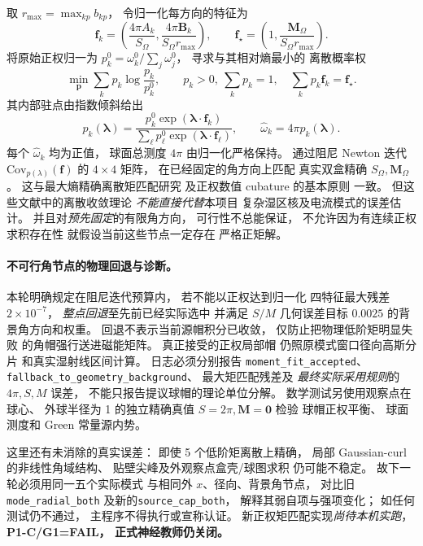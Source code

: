 取 $r_{\max}=\max_{kp}b_{kp}$，
令归一化每方向的特征为
\[
 \bm f_k=\left(
 \frac{4\pi A_k}{S_\Omega},
 \frac{4\pi\bm B_k}{S_\Omega r_{\max}}
 \right),\qquad
 \bm f_\star=
 \left(1,\frac{\bm M_\Omega}{S_\Omega r_{\max}}\right).
\]
将原始正权归一为
$p_k^0=\omega_k^0/\sum_j\omega_j^0$，
寻求与其相对熵最小的
离散概率权
\[
 \min_{\bm p}\sum_k
 p_k\log\frac{p_k}{p_k^0},
 \qquad
 p_k>0,\ \sum_kp_k=1,\quad
 \sum_kp_k\bm f_k=\bm f_\star.
\]
其内部驻点由指数倾斜给出
\begin{equation}
 p_k(\bm\lambda)=
 \frac{p_k^0\exp(\bm\lambda\cdot\bm f_k)}
      {\sum_\ell p_\ell^0
       \exp(\bm\lambda\cdot\bm f_\ell)},
 \qquad
 \widehat\omega_k=4\pi p_k(\bm\lambda).
 \label{eq:p1-c-positive-moment-tilt}
\end{equation}
每个 $\widehat\omega_k$ 均为正值，
球面总测度 $4\pi$ 由归一化严格保持。
通过阻尼 Newton 迭代
$\mathrm{Cov}_{p(\lambda)}(\bm f)$
的 $4\times4$ 矩阵，
在已经固定的角方向上匹配
真实双盒精确 $S_\Omega,\bm M_\Omega$。
这与最大熵精确离散矩匹配研究
\cite{tanaka2015exactmoments}
及正权数值 cubature 的基本原则
\cite{glaubitz2023positive} 一致。
但这些文献中的离散收敛理论
\emph{不能直接代替}本项目
复杂湿区核及电流模式的误差估计。
并且对\emph{预先固定}的有限角方向，
可行性不总能保证，
不允许因为有连续正权求积存在性
就假设当前这些节点一定存在
严格正矩解。

\paragraph{不可行角节点的物理回退与诊断。}
本轮明确规定在阻尼迭代预算内，
若不能以正权达到归一化
四特征最大残差 $2\times10^{-7}$，
\emph{整点回退}至先前已经实际选中
并满足 $S/M$ 几何误差目标
$0.0025$ 的背景角方向和权重。
回退不表示当前源帽积分已收敛，
仅防止把物理低阶矩明显失败
的角帽强行送进磁能矩阵。
真正接受的正权局部帽
仍照原模式窗口径向高斯分片
和真实湿射线区间计算。
日志必须分别报告
\texttt{moment\_fit\_accepted}、
\texttt{fallback\_to\_geometry\_background}、
最大矩匹配残差及
\emph{最终实际采用规则}的
$4\pi,S,M$ 误差，
不能只报告提议球帽的理论单位分解。
数学测试另使用观察点在球心、
外球半径为 1 的独立精确真值
$S=2\pi,\bm M=\bm0$ 检验
球帽正权平衡、
球面测度和 Green 常量源内势。

这里还有未消除的真实误差：
即使 5 个低阶矩离散上精确，
局部 Gaussian-curl 的非线性角域结构、
贴壁尖峰及外观察点盒壳/球图求积
仍可能不稳定。
故下一轮必须用同一五个实际模式
与相同外 $x$、径向、背景角节点，
对比旧 \texttt{mode\_radial\_both}
及新的\texttt{source\_cap\_both}，
解释其弱自项与强项变化；
如任何测试仍不通过，
主程序不得执行或宣称认证。
新正权矩匹配实现\emph{尚待本机实跑}，
\textbf{P1-C/G1=FAIL，
正式神经教师仍关闭。}


